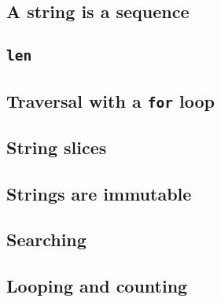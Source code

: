 \documentclass{article}
\begin{document}
\subsection{A string is a sequence}
\subsection{\texttt{len}}
\subsection{Traversal with a \texttt{for} loop}
\subsection{String slices}
\subsection{Strings are immutable}
\subsection{Searching}
\subsection{Looping and counting}
\end{document}
